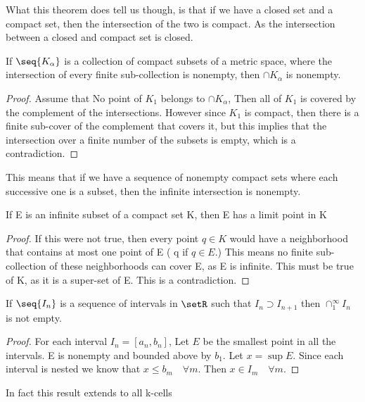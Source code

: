 \documentclass[12pt, letterpaper]{paper}
\begin{document}
What this theorem does tell us though, is that if we have a closed set
and a compact set, then the intersection of the two is compact. As the
intersection between a closed and compact set is closed.

\begin{theorem}
  \label{thr:2.36}
  If $\seq{K_{\alpha}}$ is a collection of compact subsets of a metric
  space, where the intersection of every finite sub-collection is
  nonempty, then $\cap K_{\alpha}$ is nonempty.
\end{theorem}
\begin{proof}
  Assume that No point of $K_1$ belongs to $\cap K_{\alpha}$, Then all
  of $K_1$ is covered by the complement of the intersections. However
  since $K_1$ is compact, then there is a finite sub-cover of the
  complement that covers it, but this implies that the intersection
  over a finite number of the subsets is empty, which is a
  contradiction.
\end{proof}

This means that if we have a sequence of nonempty compact sets where
each successive one is a subset, then the infinite intersection is
nonempty.

\begin{theorem}
  \label{thr:2.37}
  If E is an infinite subset of a compact set K, then E has a limit
  point in K
\end{theorem}
\begin{proof}
  If this were not true, then every point $q \in K$ would have a
  neighborhood that contains at most one point of E ( q if $q \in E$.)
  This means no finite sub-collection of these neighborhoods can cover
  E, as E is infinite. This must be true of K, as it is a super-set of
  E. This is a contradiction.
\end{proof}

\begin{theorem}
  \label{thr:2.38}
  If $\seq{I_n}$ is a sequence of intervals in $\setR$ such that
  $I_n \supset I_{n+1}$ then $\cap_1^{\infty} I_n$ is not empty.
\end{theorem}
\begin{proof}
  For each interval $I_n = [a_n, b_n]$, Let $E$ be the smallest point
  in all the intervals.  E is nonempty and bounded above by $b_1$. Let
  $x = \sup{E}$. Since each interval is nested we know that
  $x \leq b_m \quad \forall m$. Then $x \in I_m \quad \forall m$.
\end{proof}

In fact this result extends to all k-cells
\end{document}
